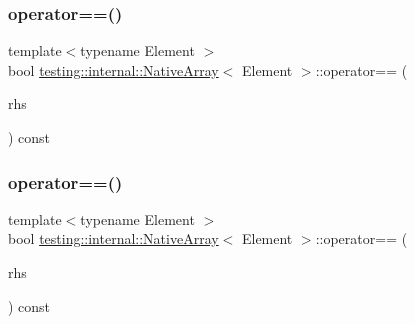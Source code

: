 \subsubsection{\texorpdfstring{operator==()}{operator==()}\hspace{0.1cm}{\footnotesize\ttfamily [2/3]}}
{\footnotesize\ttfamily template$<$typename Element $>$ \\
bool \mbox{\hyperlink{classtesting_1_1internal_1_1_native_array}{testing\+::internal\+::\+Native\+Array}}$<$ Element $>$\+::operator== (\begin{DoxyParamCaption}\item[{const \mbox{\hyperlink{classtesting_1_1internal_1_1_native_array}{Native\+Array}}$<$ Element $>$ \&}]{rhs }\end{DoxyParamCaption}) const\hspace{0.3cm}{\ttfamily [inline]}}

\mbox{\label{classtesting_1_1internal_1_1_native_array_a81b90f5739ed812610e68dc34c9e3850}} 
\subsubsection{\texorpdfstring{operator==()}{operator==()}\hspace{0.1cm}{\footnotesize\ttfamily [3/3]}}
{\footnotesize\ttfamily template$<$typename Element $>$ \\
bool \mbox{\hyperlink{classtesting_1_1internal_1_1_native_array}{testing\+::internal\+::\+Native\+Array}}$<$ Element $>$\+::operator== (\begin{DoxyParamCaption}\item[{const \mbox{\hyperlink{classtesting_1_1internal_1_1_native_array}{Native\+Array}}$<$ Element $>$ \&}]{rhs }\end{DoxyParamCaption}) const\hspace{0.3cm}{\ttfamily [inline]}}

\mbox{\label{classtesting_1_1internal_1_1_native_array_af96a4a5ca0cdd5d163c47a081f08bd89}} 
